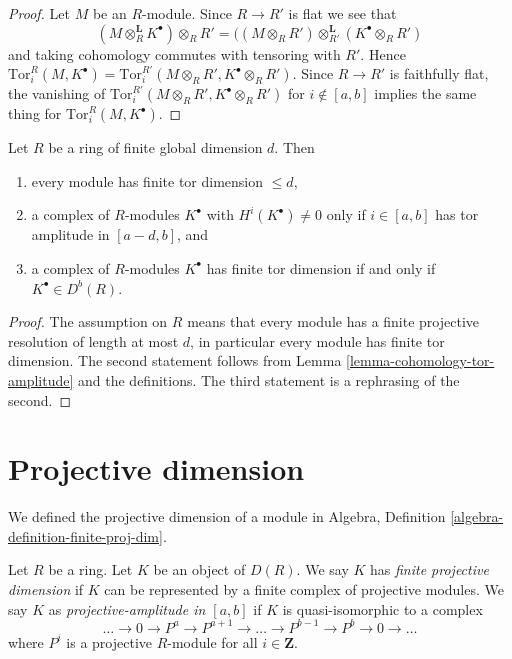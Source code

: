 \begin{proof}
Let $M$ be an $R$-module. Since $R \to R'$ is flat we see that
$$
(M \otimes_R^{\mathbf{L}} K^\bullet) \otimes_R R'
=
((M \otimes_R R') \otimes_{R'}^{\mathbf{L}} (K^\bullet \otimes_R R')
$$
and taking cohomology commutes with tensoring with $R'$.
Hence $\text{Tor}_i^R(M, K^\bullet) =
\text{Tor}_i^{R'}(M \otimes_R R', K^\bullet \otimes_R R')$.
Since $R \to R'$ is faithfully flat, the vanishing of
$\text{Tor}_i^{R'}(M \otimes_R R', K^\bullet \otimes_R R')$ for
$i \not \in [a, b]$ implies the same thing for
$\text{Tor}_i^R(M, K^\bullet)$.
\end{proof}

\begin{lemma}
\label{lemma-finite-gl-dim-tor-dimension}
Let $R$ be a ring of finite global dimension $d$. Then
\begin{enumerate}
\item every module has finite tor dimension $\leq d$,
\item a complex of $R$-modules $K^\bullet$ with $H^i(K^\bullet) \not = 0$
only if $i \in [a, b]$ has tor amplitude in $[a - d, b]$, and
\item a complex of $R$-modules $K^\bullet$ has finite tor dimension if and only
if $K^\bullet \in D^b(R)$.
\end{enumerate}
\end{lemma}

\begin{proof}
The assumption on $R$ means that every module has a finite projective
resolution of length at most $d$, in particular every module has finite
tor dimension. The second statement follows from
Lemma \ref{lemma-cohomology-tor-amplitude}
and the definitions. The third statement is a rephrasing of the second.
\end{proof}








\section{Projective dimension}
\label{section-projective-dimension}

\noindent
We defined the projective dimension of a module in
Algebra, Definition \ref{algebra-definition-finite-proj-dim}.

\begin{definition}
\label{definition-projective-dimension}
Let $R$ be a ring. Let $K$ be an object of $D(R)$. We say $K$ has
{\it finite projective dimension} if $K$ can be represented by a
finite complex of projective modules. We say $K$ as
{\it projective-amplitude in $[a, b]$} if  $K$ is quasi-isomorphic
to a complex
$$
\ldots \to 0 \to P^a \to P^{a + 1} \to \ldots \to
P^{b - 1} \to P^b \to 0 \to \ldots
$$
where $P^i$ is a projective $R$-module for all $i \in \mathbf{Z}$.
\end{definition}

